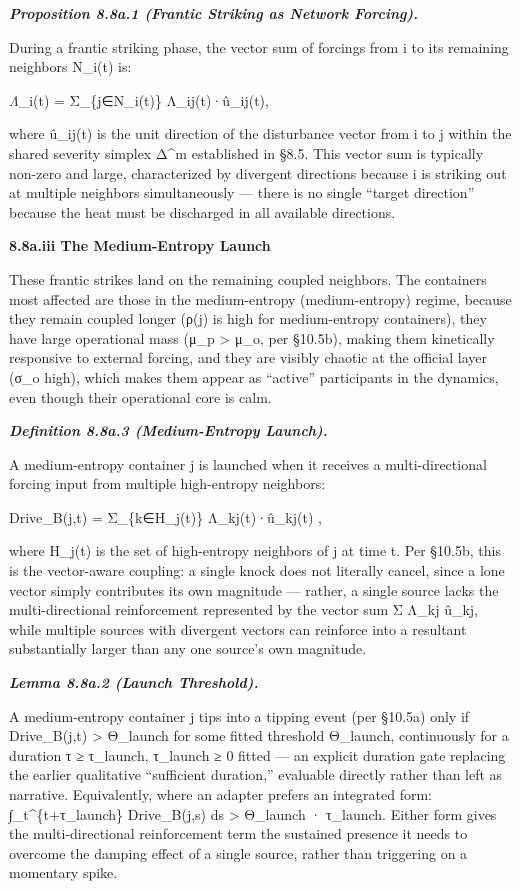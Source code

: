 \documentclass[
]{article}
\begin{document}
\emph{\textbf{Proposition 8.8a.1 (Frantic Striking as Network
Forcing).}}

During a frantic striking phase, the vector sum of forcings from i to
its remaining neighbors N\_i(t) is:

\emph{Λ⃗}\_i(t) = Σ\_\{j∈N\_i(t)\} Λ\_ij(t)·û\_ij(t),

where û\_ij(t) is the unit direction of the disturbance vector from i to
j within the shared severity simplex Δ\^{}m established in §8.5. This
vector sum is typically non-zero and large, characterized by divergent
directions because i is striking out at multiple neighbors
simultaneously --- there is no single ``target direction'' because the
heat must be discharged in all available directions.

\textbf{8.8a.iii The Medium-Entropy Launch}

These frantic strikes land on the remaining coupled neighbors. The
containers most affected are those in the medium-entropy
(medium-entropy) regime, because they remain coupled longer (ρ(j) is
high for medium-entropy containers), they have large operational mass
(μ\_p \textgreater{} μ\_o, per §10.5b), making them kinetically
responsive to external forcing, and they are visibly chaotic at the
official layer (σ\_o high), which makes them appear as ``active''
participants in the dynamics, even though their operational core is
calm.

\emph{\textbf{Definition 8.8a.3 (Medium-Entropy Launch).}}

A medium-entropy container j is launched when it receives a
multi-directional forcing input from multiple high-entropy neighbors:

Drive\_B(j,t) = Σ\_\{k∈H\_j(t)\} Λ\_kj(t)·û\_kj(t) ,

where H\_j(t) is the set of high-entropy neighbors of j at time t. Per
§10.5b, this is the vector-aware coupling: a single knock does not
literally cancel, since a lone vector simply contributes its own
magnitude --- rather, a single source lacks the multi-directional
reinforcement represented by the vector sum Σ Λ\_kj û\_kj, while
multiple sources with divergent vectors can reinforce into a resultant
substantially larger than any one source's own magnitude.

\emph{\textbf{Lemma 8.8a.2 (Launch Threshold).}}

A medium-entropy container j tips into a tipping event (per §10.5a) only
if Drive\_B(j,t) \textgreater{} Θ\_launch for some fitted threshold
Θ\_launch, continuously for a duration τ ≥ τ\_launch, τ\_launch ≥ 0
fitted --- an explicit duration gate replacing the earlier qualitative
``sufficient duration,'' evaluable directly rather than left as
narrative. Equivalently, where an adapter prefers an integrated form:
∫\_t\^{}\{t+τ\_launch\} Drive\_B(j,s) ds \textgreater{} Θ\_launch ·
τ\_launch. Either form gives the multi-directional reinforcement term
the sustained presence it needs to overcome the damping effect of a
single source, rather than triggering on a momentary spike.
\end{document}
